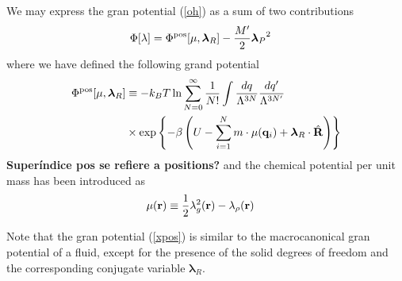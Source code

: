 \documentclass[b5paper,openright,11pt]{book}
\newcommand{\Note}[1]{{\bf \color{red}#1}}    %
\begin{document}
We may express the gran potential (\ref{oh}) as a sum of two contributions
\begin{align}
\Phi [\lambda]&=  \Phi^{\rm pos}[\mu,\boldsymbol{\lambda}_R]
-\frac{M'}{2} {\boldsymbol{\lambda}_P}^2
\end{align}
where we have defined the following grand potential
\begin{align}
\Phi^{\rm pos}[\mu,\boldsymbol{\lambda}_R]
&\equiv-k_BT\ln
 \sum_{N=0}^\infty \frac{1}{N!}
\int \frac{dq}{\Lambda^{3N}}\frac{dq'}{\Lambda^{3N'}}\nonumber\\
&\times
\exp\left\{-\beta  \left(U-\sum_{i=1}^N m\cdot\mu({\bf
    q}_i)+ \boldsymbol{\lambda}_R\cdot\hat{\bf R}\right)\right\}
\label{xpos}
\end{align}
\Note{Superíndice pos se refiere a positions?}
and the chemical potential per unit mass has been introduced as
\begin{align}
  \mu({\bf r})&\equiv\frac{1}{2}\lambda_g^2({\bf r})-\lambda_\rho({\bf r})
\label{chempot}
\end{align}

Note that the gran potential (\ref{xpos}) is similar to the macrocanonical gran potential of a fluid, except for the presence of the solid degrees of freedom and the corresponding conjugate variable $\boldsymbol{\lambda}_R$. 
\end{document}
